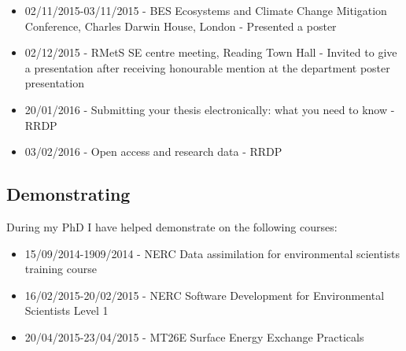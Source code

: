 \documentclass[11pt]{article}
\begin{document}
\begin{itemize}
\item 02/11/2015-03/11/2015 - BES Ecosystems and Climate Change Mitigation Conference, Charles Darwin House, London - Presented a poster

\item 02/12/2015 - RMetS SE centre meeting, Reading Town Hall - Invited to give a presentation after receiving honourable mention at the department poster presentation

\item 20/01/2016 - Submitting your thesis electronically: what you need to know - RRDP

\item 03/02/2016 - Open access and research data - RRDP
\end{itemize}

\subsection{Demonstrating}
During my PhD I have helped demonstrate on the following courses:
\begin{itemize}
\item 15/09/2014-1909/2014 - NERC Data assimilation for environmental scientists training course

\item 16/02/2015-20/02/2015 - NERC Software Development for Environmental Scientists Level 1

\item 20/04/2015-23/04/2015 - MT26E Surface Energy Exchange Practicals
\end{itemize}


{}
%
\end{document}
